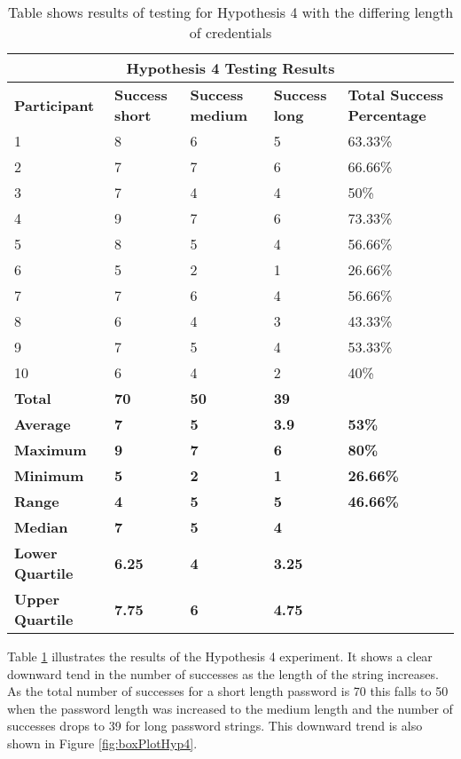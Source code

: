 \documentclass{article}
\begin{document}
{
\begin{table} [H]
\centering
\begin{tabular}{ |p{2cm}|p{2cm}|p{2cm}| p{2cm}| p{2cm}| }
\hline
\multicolumn{5}{|c|}{\textbf{Hypothesis 4 Testing Results}} \\
\hline
\textbf{Participant} & \textbf{Success short} & \textbf{Success medium} & \textbf{Success long}  & \textbf{Total Success Percentage} \\
\hline
1 & 8 & 6 & 5 & 63.33\% \\
\hline
2 & 7 & 7 & 6 & 66.66\% \\
\hline
3 & 7 & 4 & 4 & 50\% \\
\hline
4 & 9 & 7 & 6 & 73.33\%  \\
\hline
5 & 8 & 5 & 4 & 56.66\% \\
\hline
6 & 5 & 2 & 1 & 26.66\% \\
\hline
7 & 7 & 6 & 4 & 56.66\% \\
\hline
8 & 6 & 4 & 3 & 43.33\% \\
\hline
9 & 7 & 5 & 4 & 53.33\% \\
\hline
10 & 6 & 4 & 2 & 40\% \\
\hline
\textbf{Total} & \textbf{70} & \textbf{50} & \textbf{39} & \\
\hline
\textbf{Average} & \textbf{7} & \textbf{5} & \textbf{3.9} & \textbf{53\%} \\
\hline
\textbf{Maximum} & \textbf{9} & \textbf{7} & \textbf{6} & \textbf{80\%} \\
\hline
\textbf{Minimum} & \textbf{5} & \textbf{2} & \textbf{1} & \textbf{26.66\%} \\
\hline
\textbf{Range} & \textbf{4} & \textbf{5} & \textbf{5} & \textbf{46.66\%} \\
\hline
\textbf{Median} & \textbf{7} & \textbf{5} & \textbf{4} & \\
\hline
\textbf{Lower Quartile} & \textbf{6.25} & \textbf{4} & \textbf{3.25} &  \\
\hline
\textbf{Upper Quartile}& \textbf{7.75} & \textbf{6} & \textbf{4.75} &  \\
\hline
\end{tabular}
\caption{Table shows results of testing for Hypothesis 4 with the differing length of credentials}
\label{table:5}
\end{table}
}

Table \ref{table:5} illustrates the results of the Hypothesis 4 experiment. It shows a clear downward tend in the number of successes as the length of the string increases. As the total number of successes for a short length password is 70 this falls to 50 when the password length was increased to the medium length and the number of successes drops to 39 for long password strings. This downward trend is also shown in Figure \ref{fig:boxPlotHyp4}. 
\end{document}
